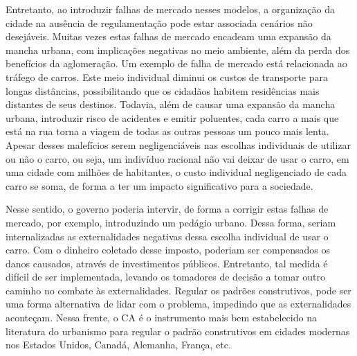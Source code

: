 Entretanto, ao introduzir falhas de mercado nesses modelos, a organização da cidade na ausência de regulamentação pode estar associada cenários não desejáveis. Muitas vezes estas falhas de mercado encadeam uma expansão da mancha urbana, com implicações negativas no meio ambiente, além da perda dos benefícios da aglomeração. Um exemplo de falha de mercado está relacionada ao tráfego de carros. Este meio individual diminui os custos de transporte para longas distâncias, possibilitando que os cidadãos habitem residências mais distantes de seus destinos. Todavia, além de causar uma expansão da mancha urbana, introduzir risco de acidentes e emitir poluentes, cada carro a mais que está na rua torna a viagem de todas as outras pessoas um pouco mais lenta. Apesar desses malefícios serem negligenciáveis nas escolhas individuais de utilizar ou não o carro, ou seja, um indivíduo racional não vai deixar de usar o carro, em uma cidade com milhões de habitantes, o custo individual negligenciado de cada carro se soma, de forma a ter um impacto significativo para a sociedade.

Nesse sentido, o governo poderia intervir, de forma a corrigir estas falhas de mercado, por exemplo, introduzindo um pedágio urbano. Dessa forma, seriam internalizadas as externalidades negativas dessa escolha individual de usar o carro. Com o dinheiro coletado desse imposto, poderiam ser compensados os danos causados, através de investimentos públicos. Entretanto, tal medida é difícil de ser implementada, levando os tomadores de decisão a tomar outro caminho no combate às externalidades. Regular os padrões construtivos, pode ser uma forma alternativa de lidar com o problema, impedindo que as externalidades aconteçam. Nessa frente, o CA é o instrumento mais bem estabelecido na literatura do urbanismo para regular o padrão construtivos em cidades modernas nos Estados Unidos, Canadá, Alemanha, França, etc.


